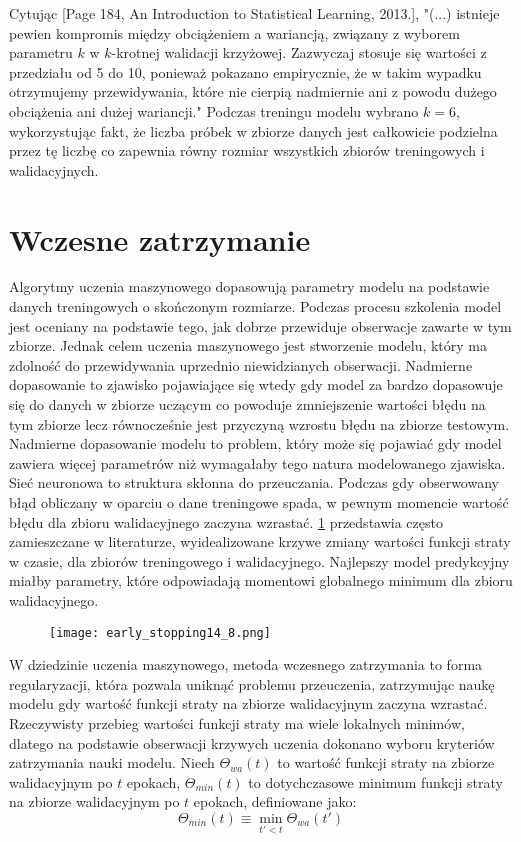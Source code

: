 \documentclass[]{article}
\theoremstyle{definition}
\begin{document}
Cytując [Page 184, An Introduction to Statistical Learning, 2013.], "(...) istnieje pewien kompromis między obciążeniem a wariancją, związany z wyborem parametru $k$ w $k$-krotnej walidacji krzyżowej. Zazwyczaj stosuje się wartości z przedziału od 5 do 10, ponieważ pokazano empirycznie, że w takim wypadku otrzymujemy przewidywania, które nie cierpią nadmiernie ani z powodu dużego obciążenia ani dużej wariancji." Podczas treningu modelu wybrano $k = 6$, wykorzystując fakt, że liczba próbek w zbiorze danych jest całkowicie podzielna przez tę liczbę co zapewnia równy rozmiar wszystkich zbiorów treningowych i walidacyjnych.

\section{Wczesne zatrzymanie}
Algorytmy uczenia maszynowego dopasowują parametry modelu na podstawie danych treningowych o skończonym rozmiarze. Podczas procesu szkolenia model jest oceniany na podstawie tego, jak dobrze przewiduje obserwacje zawarte w tym zbiorze. Jednak celem uczenia maszynowego jest stworzenie modelu, który ma zdolność do przewidywania uprzednio niewidzianych obserwacji. Nadmierne dopasowanie to zjawisko pojawiające się wtedy gdy model za bardzo dopasowuje się do danych w zbiorze uczącym co powoduje zmniejszenie wartości błędu na tym zbiorze lecz równocześnie jest przyczyną wzrostu błędu na zbiorze testowym. Nadmierne dopasowanie modelu to problem, który może się pojawiać gdy model zawiera więcej parametrów niż wymagałaby tego natura modelowanego zjawiska. Sieć neuronowa to struktura skłonna do przeuczania. Podczas gdy obserwowany błąd obliczany w oparciu o dane treningowe spada, w pewnym momencie wartość błędu dla zbioru walidacyjnego zaczyna wzrastać. \figurename{} \ref{fig:loss_curves} przedstawia często zamieszczane w literaturze, wyidealizowane krzywe zmiany wartości funkcji straty w czasie, dla zbiorów treningowego i walidacyjnego. Najlepszy model predykcyjny miałby parametry, które odpowiadają momentowi globalnego minimum dla zbioru walidacyjnego.




\begin{figure}[htp!]
	\centering
	\texttt{[image: early\_stopping14\_8.png]}
	\caption{}
	\label{fig:loss_curves}
\end{figure}

W dziedzinie uczenia maszynowego, metoda wczesnego zatrzymania to forma regularyzacji, która pozwala uniknąć problemu przeuczenia, zatrzymując naukę modelu gdy wartość funkcji straty na zbiorze walidacyjnym zaczyna wzrastać. Rzeczywisty przebieg wartości funkcji straty ma wiele lokalnych minimów, dlatego na podstawie obserwacji krzywych uczenia dokonano wyboru kryteriów zatrzymania nauki modelu. 
 Niech $\Theta_{wa}(t)$ to wartość funkcji straty na zbiorze walidacyjnym po $t$ epokach, $\Theta_{min}(t)$ to dotychczasowe minimum funkcji straty na zbiorze walidacyjnym po $t$ epokach, definiowane jako:
 $$
 \Theta_{min}(t) \equiv \min_{t' < t} \Theta_{wa}(t')
 $$
 
\end{document}

